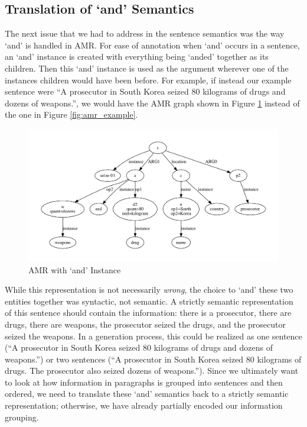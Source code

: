 \documentclass[12pt]{article}
\begin{document}
\subsection{Translation of `and' Semantics}
The next issue that we had to address in the sentence semantics was the way `and' is handled in AMR. For ease of annotation when `and' occurs in a sentence, an `and' instance is created with everything being `anded' together as its children. Then this `and' instance is used as the argument wherever one of the instances children would have been before. For example, if instead our example sentence were ``A prosecutor in South Korea seized 80 kilograms of drugs and dozens of weapons.'', we would have the AMR graph shown in Figure \ref{fig:amr_example_and} instead of the one in Figure \ref{fig:amr_example}.

\begin{figure}
\includegraphics[width=\linewidth]{amr_example_and.pdf}
\caption{AMR with `and' Instance}
\label{fig:amr_example_and}
\end{figure}

While this representation is not necessarily {\em wrong}, the choice to `and' these two entities together was syntactic, not semantic. A strictly semantic representation of this sentence should contain the information: there is a prosecutor, there are drugs, there are weapons, the prosecutor seized the drugs, and the prosecutor seized the weapons. In a generation process, this could be realized as one sentence (``A prosecutor in South Korea seized 80 kilograms of drugs and dozens of weapons.'') or two sentences (``A prosecutor in South Korea seized 80 kilograms of drugs. The prosecutor also seized dozens of weapons.''). Since we ultimately want to look at how information in paragraphs is grouped into sentences and then ordered, we need to translate these `and' semantics back to a strictly semantic representation; otherwise, we have already partially encoded our information grouping.
\end{document}
